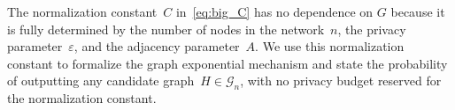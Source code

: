 \documentclass[conference]{ieeeconf}
\newcommand{\FN}{Fr\'echet-Nikodym }
\newcommand{\G}{\mathcal{G}}
\newcommand{\uti}{d_\Delta}
\begin{document}

The normalization constant~$C$ in~\eqref{eq:big_C} has no dependence on $G$ because 
it is fully determined by the number of nodes in the network~$n$, the privacy parameter~$\varepsilon$, and the adjacency parameter~$A$. 
We use this normalization constant to formalize the graph exponential mechanism and state the probability of outputting any candidate graph~$H\in\mathcal{G}_n$, with no privacy budget reserved for the normalization constant. 
\end{document}

